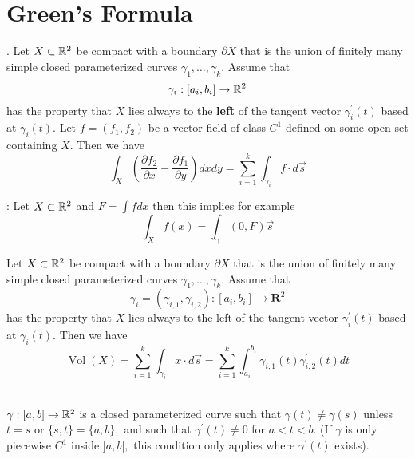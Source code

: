 \section{Green's Formula}

\Theorem [Green]. Let $X \subset \mathbb{R}^{2}$ be compact with a boundary $\partial X$ that is the union of finitely many simple closed parameterized curves $\gamma_{1}, \ldots, \gamma_{k} .$ Assume that
$$
\gamma_{i}:\left[a_{i}, b_{i}\right] \rightarrow \mathbb{R}^{2}
$$
has the property that $X$ lies always to the \textbf{left} of the tangent vector $\gamma_{i}^{\prime}(t)$ based at $\gamma_{i}(t)$. Let $f=\left(f_{1}, f_{2}\right)$ be a vector field of class $C^{1}$ defined on some open set containing $X .$ Then we have
$$
\int_{X}\left(\frac{\partial f_{2}}{\partial x}-\frac{\partial f_{1}}{\partial y}\right) d x d y=\sum_{i=1}^{k} \int_{\gamma_{i}} f \cdot d \vec{s}
$$

: Let $X \subset \mathbb{R}^{2}$ and $F = \int f dx$ then this implies for example
$$\int_{X} f(x) = \int_{\gamma} (0, F)\vec{s}$$

\Corollary [4.6.5] Let $X \subset \mathbb{R}^{2}$ be compact with a boundary $\partial X$ that is the union of finitely many simple closed parameterized curves $\gamma_{1}, \ldots, \gamma_{k} .$ Assume that
$$
\gamma_{i}=\left(\gamma_{i, 1}, \gamma_{i, 2}\right):\left[a_{i}, b_{i}\right] \rightarrow \mathbf{R}^{2}
$$
has the property that $X$ lies always to the left of the tangent vector $\gamma_{i}^{\prime}(t)$ based at $\gamma_{i}(t)$. Then we have
$$
\operatorname{Vol}(X)=\sum_{i=1}^{k} \int_{\gamma_{i}} x \cdot d \vec{s}=\sum_{i=1}^{k} \int_{a_{i}}^{b_{i}} \gamma_{i, 1}(t) \gamma_{i, 2}^{\prime}(t) d t
$$

 \\$\gamma:[a, b] \rightarrow \mathbb{R}^{2}$ is a closed parameterized curve such that $\gamma(t) \neq \gamma(s)$ unless $t=s$ or $\{s, t\}=\{a, b\},$ and such that $\gamma^{\prime}(t) \neq 0$ for $a<t<b .$ (If $\gamma$ is only piecewise $C^{1}$ inside $] a, b[,$ this condition only applies where $\gamma^{\prime}(t)$ exists).



\begin{comment}
	
\end{comment}